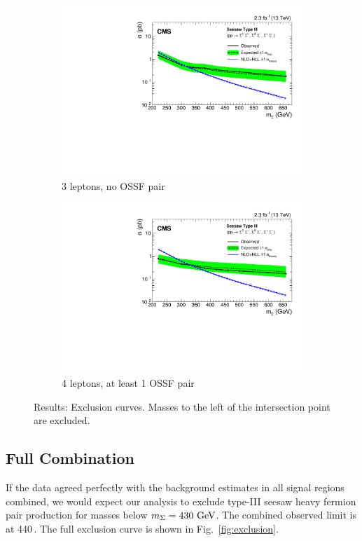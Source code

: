 \begin{figure}
\begin{center}
\begin{subfigure}[b]{.5\textwidth}
		\includegraphics[width=\textwidth]{Results/exclusion-L3DY0}
		\caption{3 leptons, no OSSF pair}
	\end{subfigure}%
	\begin{subfigure}[b]{.5\textwidth}
		\includegraphics[width=\textwidth]{Results/exclusion-L4DYgt0}
		\caption{4 leptons, at least 1 OSSF pair}
	\end{subfigure}%
	\caption{Results: Exclusion curves. Masses to the left of the intersection point are excluded.
	\label{fig:exclusions}}
\end{center}
\end{figure}

\subsection{Full Combination}
If the data agreed perfectly with the background estimates in all signal regions combined, we would expect our analysis to exclude type-III seesaw heavy fermion pair production for masses below $m_\Sigma = 430\,\,\text{Ge\hspace{-.08em}V}$. The combined observed limit is at 440\,\GeV. The full exclusion curve is shown in Fig.~\ref{fig:exclusion}.

